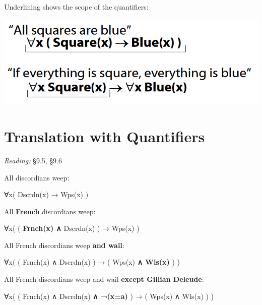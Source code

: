 \documentclass[12pt]{extarticle}
\begin{document}
\begin{multicols*}{3}
\begin{minipage}{\columnwidth}
Underlining shows the scope of the quantifiers:
 
\begin{center}
\includegraphics[scale=0.3]{img/scope_quantifiers.png}
\end{center}
\end{minipage}
 
 
 
\section{Translation with Quantifiers}
 
\emph{Reading:} §9.5, §9.6
 
\begin{minipage}{\columnwidth}
 
All discordians weep:
 
∀x( Dscrdn(x) → Wps(x) )
 
\end{minipage}
 
\begin{minipage}{\columnwidth}
 
All \textbf{French} discordians weep:
 
∀x( ( \textbf{Frnch(x) ∧} Dscrdn(x) ) → Wps(x) )
 
\end{minipage}
 
\begin{minipage}{\columnwidth}
 
All French discordians weep \textbf{and wail}:
 
∀x( ( Frnch(x) ∧ Dscrdn(x) ) → ( Wps(x) \textbf{ ∧ Wls(x)} ) )
 
\end{minipage}
 
\begin{minipage}{\columnwidth}
 
All French discordians weep and wail \textbf{except Gillian Deleude}:
 
∀x( ( Frnch(x) ∧ Dscrdn(x) \textbf{∧ ¬(x=a)} ) → ( Wps(x) ∧ Wls(x) ) )
 

\end{minipage}
\end{multicols*}
\end{document}
